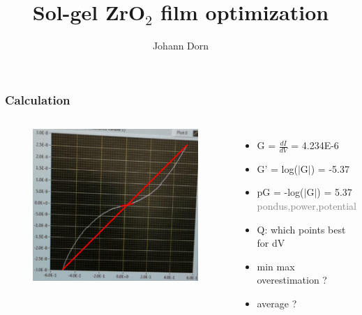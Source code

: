 \documentclass{beamer}
\title[short title]{Sol-gel ZrO$_2$ film optimization}
\author{Johann Dorn}
\newcommand{\me}[1]{\textcolor{gray}{#1}}
\begin{document}
\begin{frame}
 \titlepage
\end{frame}

\begin{frame}
	\frametitle[center]{Calculation}
	\begin{columns}[t]
		\begin{figure}
			\includegraphics[width=.9\textwidth]{pics/iv_grad.png}
		\end{figure}
	\begin{itemize}
		\item G = $\frac{dI}{dV}$ = 4.234E-6
		\item G' = log($|$G$|$) = -5.37
		\item pG = -log($|$G$|$) = 5.37 \me{pondus,power,potential}
		\item Q: which points best for dV
		\item min max overestimation ? 
		\item average ?
	\end{itemize}
	\end{columns}
\end{frame}
\end{document}
